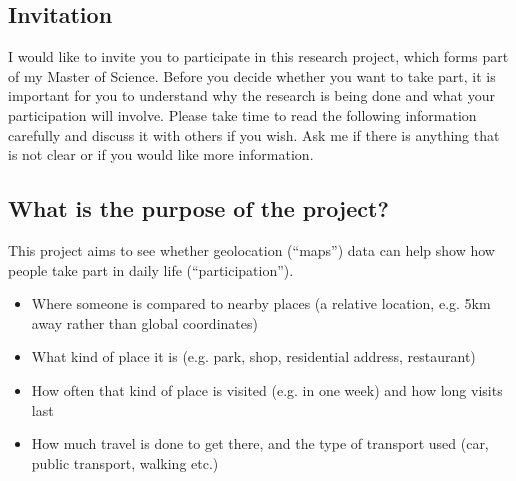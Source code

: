 
\subsection*{Invitation}
I would like to invite you to participate in this research project, which forms part of my Master of Science. Before you decide whether you want to take part, it is important for you to understand why the research is being done and what your participation will involve. Please take time to read the following information carefully and discuss it with others if you wish. Ask me if there is anything that is not clear or if you would like more information.

\subsection*{What is the purpose of the project?}
This project aims to see whether geolocation (``maps'') data can help show how people take part in daily life (``participation'').

\begin{itemize}
    \item Where someone is compared to nearby places (a relative location, e.g. 5km away rather than global coordinates)
    \item What kind of place it is (e.g. park, shop, residential address, restaurant)
    \item How often that kind of place is visited (e.g. in one week) and how long visits last
    \item How much travel is done to get there, and the type of transport used (car, public transport, walking etc.)
\end{itemize}

